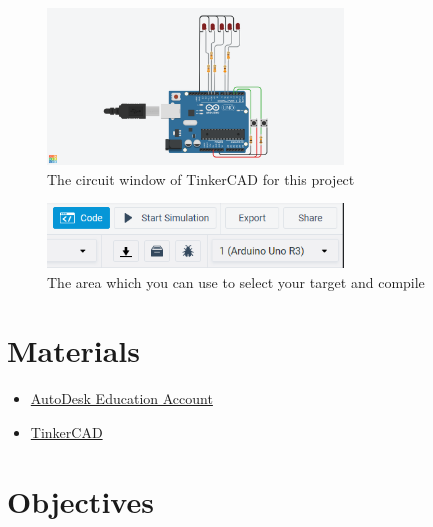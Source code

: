 \documentclass{article}
\begin{document}
        \begin{figure}[ht]
            \centering
            \includegraphics[width = 0.7\textwidth]{images/TinkerCadWires.png}
            \caption{The circuit window of TinkerCAD for this project}
        \end{figure}
        
        \begin{figure}[ht]
            \centering
            \includegraphics[width = 0.7\textwidth]{images/TinkerCadCode.png}
            \caption{The area which you can use to select your target and compile}
        \end{figure}
        
\section{Materials}
\begin{itemize}
	\item \href{https://www.autodesk.com/education/edu-software/overview}{AutoDesk Education Account}
	\item \href{https://www.tinkercad.com/things/8J1RA4SvqOM}{TinkerCAD}
\end{itemize}
\section{Objectives}
\end{document}
